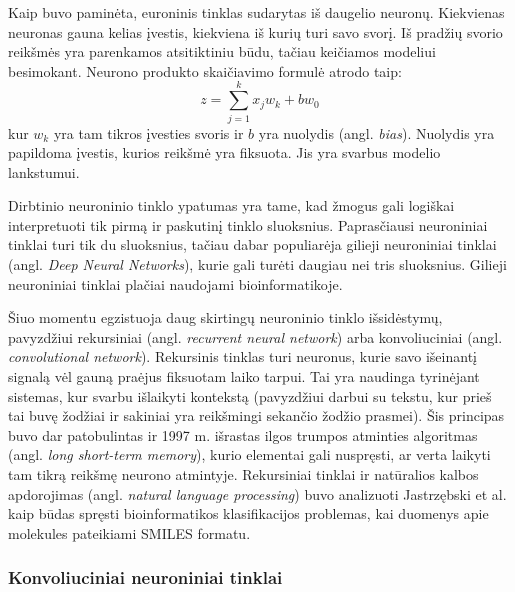 Kaip buvo paminėta, euroninis tinklas sudarytas iš daugelio neuronų. Kiekvienas neuronas gauna kelias įvestis, kiekviena iš kurių turi savo svorį. Iš pradžių svorio reikšmės yra parenkamos atsitiktiniu būdu, tačiau keičiamos modeliui besimokant. Neurono produkto skaičiavimo formulė atrodo taip:
\begin{equation}
z=\sum_{j=1}^{k} x_{j} w_{k}+b w_{0}
\end{equation}
kur $w_k$ yra tam tikros įvesties svoris ir $b$ yra nuolydis (angl. \textit{bias}). Nuolydis yra papildoma įvestis, kurios reikšmė yra fiksuota. Jis yra svarbus modelio lankstumui.

Dirbtinio neuroninio tinklo ypatumas yra tame, kad žmogus gali logiškai interpretuoti tik pirmą ir paskutinį tinklo sluoksnius. Paprasčiausi neuroniniai tinklai turi tik du sluoksnius, tačiau dabar populiarėja gilieji neuroniniai tinklai (angl. \textit{Deep Neural Networks}), kurie gali turėti daugiau nei tris sluoksnius. %
Gilieji neuroniniai tinklai plačiai naudojami bioinformatikoje.\cite{chen_hidden_2019}\cite{stepniewska-dziubinska_development_2018}

Šiuo momentu egzistuoja daug skirtingų neuroninio tinklo išsidėstymų, pavyzdžiui rekursiniai (angl. \textit{recurrent neural network}) arba konvoliuciniai (angl. \textit{convolutional network}). Rekursinis tinklas turi neuronus, kurie savo išeinantį signalą vėl gauną praėjus fiksuotam laiko tarpui. Tai yra naudinga tyrinėjant sistemas, kur svarbu išlaikyti kontekstą (pavyzdžiui darbui su tekstu, kur prieš tai buvę žodžiai ir sakiniai yra reikšmingi sekančio žodžio prasmei). Šis principas buvo dar patobulintas ir 1997 m. išrastas ilgos trumpos atminties algoritmas (angl. \textit{long short-term memory}), kurio elementai gali nuspręsti, ar verta laikyti tam tikrą reikšmę neurono atmintyje. Rekursiniai tinklai ir natūralios kalbos apdorojimas (angl. \textit{natural language processing}) buvo analizuoti Jastrzębski et al.\cite{jastrzebski_learning_2018} kaip būdas spręsti bioinformatikos klasifikacijos problemas, kai duomenys apie molekules pateikiami SMILES formatu.

\subsubsection{Konvoliuciniai neuroniniai tinklai}

